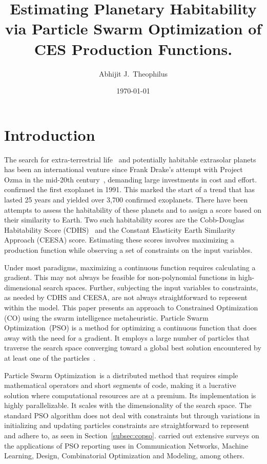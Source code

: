 \documentclass[10pt,draft]{article}
\title{Estimating Planetary Habitability via Particle Swarm Optimization of CES Production Functions.}
\author{Abhijit J.\ Theophilus}
\date{\today}
\newcommand{\pso}{Particle Swarm Optimization}
\begin{document}
\maketitle


\section{Introduction}\label{sec:intro}

The search for extra-terrestrial life~\cite{Seth1,Biosig} and potentially habitable extrasolar
planets~\cite{Kepler,Presto} has been an international venture since Frank Drake's attempt with Project Ozma in the
mid-20th century~\cite{Ozma}, demanding large investments in cost and effort. \textcite{Exo1} confirmed the first
exoplanet in 1991. This marked the start of a trend that has lasted 25 years and yielded over 3,700 confirmed
exoplanets. There have been attempts to assess the habitability of these planets and to assign a score based on their
similarity to Earth. Two such habitability scores are the Cobb-Douglas Habitability Score (CDHS)~\cite{Bora,Saha} and
the Constant Elasticity Earth Similarity Approach (CEESA) score. Estimating these scores involves maximizing a
production function while observing a set of constraints on the input variables.

Under most paradigms, maximizing a continuous function requires calculating a gradient. This may not always be feasible
for non-polynomial functions in high-dimensional search spaces. Further, subjecting the input variables to constraints,
as needed by CDHS and CEESA, are not always straightforward to represent within the model. This paper presents an
approach to Constrained Optimization (CO) using the swarm intelligence metaheuristic. \pso\ (PSO) is a method for
optimizing a continuous function that does away with the need for a gradient. It employs a large number of particles
that traverse the search space converging toward a global best solution encountered by at least one of the
particles~\cite{PSO1,PSO2}.

\pso\ is a distributed method that requires simple mathematical operators and short segments of code, making it a
lucrative solution where computational resources are at a premium. Its implementation is highly parallelizable. It
scales with the dimensionality of the search space. The standard PSO algorithm does not deal with constraints but
through variations in initializing and updating particles constraints are straightforward to represent and adhere to, as
seen in Section~\ref{subsec:copso}. \textcite{Poli1,Poli2} carried out extensive surveys on the applications of PSO
reporting uses in Communication Networks, Machine Learning, Design, Combinatorial Optimization and Modeling, among
others.
\end{document}
